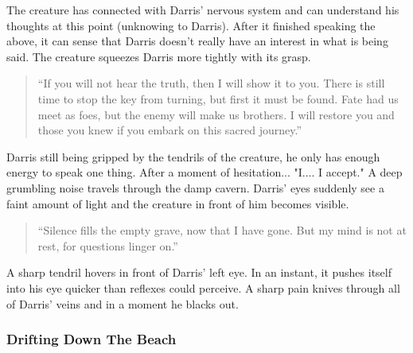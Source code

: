 The creature has connected with Darris' nervous system and can understand his thoughts at this point (unknowing to Darris). After it finished speaking the above, it can sense that Darris doesn't really have an interest in what is being said. The creature squeezes Darris more tightly with its grasp.

\begin{quote}
	``If you will not hear the truth, then I will show it to you. There is still time to stop the key from turning, but first it must be found. Fate had us meet as foes, but the enemy will make us brothers. I will restore you and those you knew if you embark on this sacred journey.''
\end{quote}

Darris still being gripped by the tendrils of the creature, he only has enough energy to speak one thing. After a moment of hesitation... "I.... I accept." A deep grumbling noise travels through the damp cavern. Darris' eyes suddenly see a faint amount of light and the creature in front of him becomes visible. 

\begin{quote}
	``Silence fills the empty grave, now that I have gone. But my mind is not at rest, for questions linger on.''
\end{quote}

A sharp tendril hovers in front of Darris' left eye. In an instant, it pushes itself into his eye quicker than reflexes could perceive. A sharp pain knives through all of Darris' veins and in a moment he blacks out.

\subsubsection{Drifting Down The Beach}

